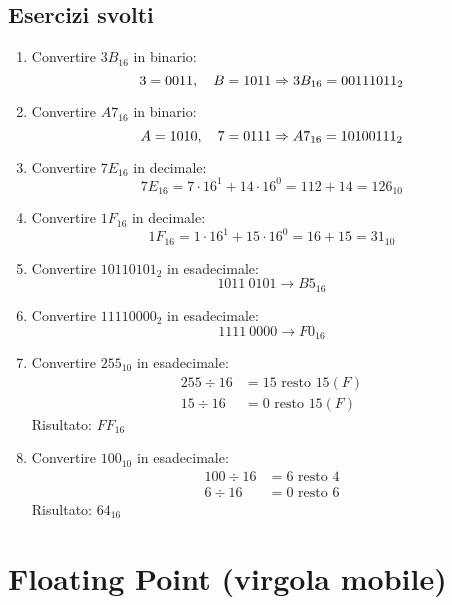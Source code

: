 \documentclass[12pt,a4paper]{article}
\begin{document}
\subsection{Esercizi svolti}
\begin{enumerate}
    \item Convertire $3B_{16}$ in binario:
    \[
    3 = 0011, \quad B = 1011 \\
    \Rightarrow 3B_{16} = 00111011_2
    \]

    \item Convertire $A7_{16}$ in binario:
    \[
    A = 1010, \quad 7 = 0111 \\
    \Rightarrow A7_{16} = 10100111_2
    \]

    \item Convertire $7E_{16}$ in decimale:
    \[
    7E_{16} = 7\cdot16^1 + 14\cdot16^0 = 112 + 14 = 126_{10}
    \]

    \item Convertire $1F_{16}$ in decimale:
    \[
    1F_{16} = 1\cdot16^1 + 15\cdot16^0 = 16 + 15 = 31_{10}
    \]

    \item Convertire $10110101_2$ in esadecimale:
    \[
    1011\ 0101 \rightarrow B5_{16}
    \]

    \item Convertire $11110000_2$ in esadecimale:
    \[
    1111\ 0000 \rightarrow F0_{16}
    \]

    \item Convertire $255_{10}$ in esadecimale:
    \begin{align*}
    255 \div 16 &= 15 \text{ resto } 15 (F) \\
    15 \div 16 &= 0 \text{ resto } 15 (F)
    \end{align*}
    Risultato: $FF_{16}$

    \item Convertire $100_{10}$ in esadecimale:
    \begin{align*}
    100 \div 16 &= 6 \text{ resto } 4 \\
    6 \div 16 &= 0 \text{ resto } 6
    \end{align*}
    Risultato: $64_{16}$

\end{enumerate}


\newpage
\section{Floating Point (virgola mobile)}
\end{document}
